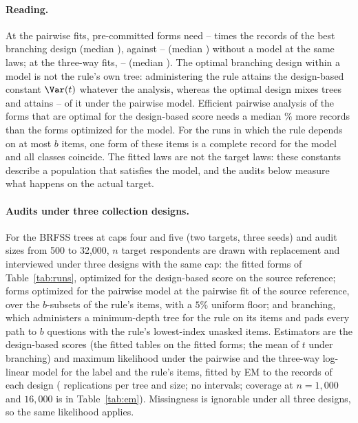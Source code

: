 \paragraph{Reading.}
At the pairwise fits, pre-committed forms need \nModelTwoLo--\nModelTwoHi{} times the records of the best branching design (median \nModelTwoMed), against \nModelDesignLo--\nModelDesignHi{} (median \nModelDesignMed) without a model at the same laws; at the three-way fits, \nModelThreeLo--\nModelThreeHi{} (median \nModelThreeMed). The optimal branching design within a model is not the rule's own tree: administering the rule attains the design-based constant $\Var(t)$ whatever the analysis, whereas the optimal design mixes trees and attains \nModelTwoBrLo--\nModelTwoBrHi{} of it under the pairwise model. Efficient pairwise analysis of the forms that are optimal for the design-based score needs a median \nModelTwoDesForms\% more records than the forms optimized for the model. For the runs in which the rule depends on at most $b$ items, one form of these items is a complete record for the model and all classes coincide. The fitted laws are not the target laws: these constants describe a population that satisfies the model, and the audits below measure what happens on the actual target.

\paragraph{Audits under three collection designs.}
For the BRFSS trees at caps four and five (two targets, three seeds) and audit sizes from 500 to 32,000, $n$ target respondents are drawn with replacement and interviewed under three designs with the same cap: the fitted forms of Table~\ref{tab:runs}, optimized for the design-based score on the source reference; forms optimized for the pairwise model at the pairwise fit of the source reference, over the $b$-subsets of the rule's items, with a $5\%$ uniform floor; and branching, which administers a minimum-depth tree for the rule on its items and pads every path to $b$ questions with the rule's lowest-index unasked items. Estimators are the design-based scores (the fitted tables on the fitted forms; the mean of $t$ under branching) and maximum likelihood under the pairwise and the three-way log-linear model for the label and the rule's items, fitted by EM to the records of each design (\nCurveReps{} replications per tree and size; no intervals; coverage at $n=1{,}000$ and $16{,}000$ is in Table~\ref{tab:em}). Missingness is ignorable under all three designs, so the same likelihood applies.

\nAuditAppendixText

